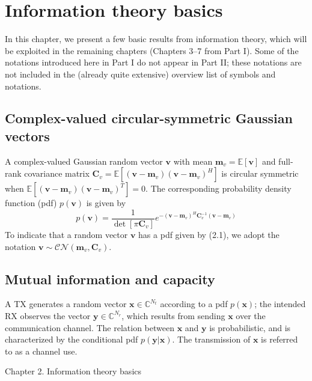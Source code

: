 \documentclass[11pt,a4paper]{report}
\begin{document}
\setcounter{page}{9}
\chapter{Information theory basics}

In this chapter, we present a few basic results from information theory, which will be exploited in the remaining chapters (Chapters 3--7 from Part I). Some of the notations introduced here in Part I do not appear in Part II; these notations are not included in the (already quite extensive) overview list of symbols and notations.

\section{Complex-valued circular-symmetric Gaussian vectors}

A complex-valued Gaussian random vector $\mathbf{v}$ with mean $\mathbf{m}_v = \mathbb{E}[\mathbf{v}]$ and full-rank covariance matrix $\mathbf{C}_v = \mathbb{E}[(\mathbf{v}-\mathbf{m}_v)(\mathbf{v}-\mathbf{m}_v)^H]$ is circular symmetric when $\mathbb{E}[(\mathbf{v}-\mathbf{m}_v)(\mathbf{v}-\mathbf{m}_v)^T] = 0$. The corresponding probability density function (pdf) $p(\mathbf{v})$ is given by
\begin{equation}
    p(\mathbf{v}) = \frac{1}{\det[\pi \mathbf{C}_v]} e^{-(\mathbf{v}-\mathbf{m}_v)^H \mathbf{C}_v^{-1} (\mathbf{v}-\mathbf{m}_v)}
\end{equation}
To indicate that a random vector $\mathbf{v}$ has a pdf given by (2.1), we adopt the notation $\mathbf{v} \sim \mathcal{CN}(\mathbf{m}_v, \mathbf{C}_v)$.

\section{Mutual information and capacity}

A TX generates a random vector $\mathbf{x} \in \mathbb{C}^{N_t}$ according to a pdf $p(\mathbf{x})$; the intended RX observes the vector $\mathbf{y} \in \mathbb{C}^{N_r}$, which results from sending $\mathbf{x}$ over the communication channel. The relation between $\mathbf{x}$ and $\mathbf{y}$ is probabilistic, and is characterized by the conditional pdf $p(\mathbf{y}|\mathbf{x})$. The transmission of $\mathbf{x}$ is referred to as a channel use.

\newpage
 \hfill Chapter 2. Information theory basics \\
\end{document}
